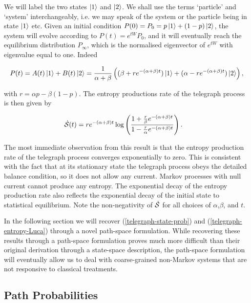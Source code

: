 We will label the two states $\ket{1} $ and $\ket{2}$. We shall use the terms `particle' and `system' interchangeably, i.e. we may speak of the system or the particle being in state $\ket{1}$ etc. Given an initial condition $P(0) = P_0 = p\ket{1}  + (1-p)\ket{2} $, the system will evolve according to $P(t) = e^{tW}P_0$, and it will eventually reach the equilibrium distribution $P_\infty$, which is the normalised eigenvector of $e^{tW}$ with eigenvalue equal to one. Indeed

\begin{equation}\label{telegraph-state-prob}
  P(t) = A(t)\ket{1}  + B(t)\ket{2}  = \frac{1}{\alpha + \beta} \left((\beta + re^{-(\alpha + \beta)t})\ket{1}  +
(\alpha - re^{-(\alpha + \beta)t})\ket{2}  \right) ,
\end{equation}

with $r = \alpha p - \beta(1-p)$. The entropy productions rate of the telegraph process is then given by  \cite{cocconi2020entropy}

\begin{align}\label{telegraph-entropy-Luca}
  \dot{\mathcal{S}}(t) &= re^{-(\alpha + \beta)t}\log \left(\frac{1+\frac{r}{\beta}e^{-(\alpha + \beta)t}}{1-\frac{r}{\alpha}e^{-(\alpha + \beta)t}}\right).
\end{align}


 The most immediate observation from this result is that the entropy production rate of the telegraph process converges exponentially to zero. This is consistent with the fact that at its stationary state the telegraph process obeys the detailed balance condition, so it does not allow any current. Markov processes with null current cannot produce any entropy. The exponential decay of the entropy production rate also reflects the exponential decay of the initial state to statistical equilibrium. Note the non-negativity of $\dot{\mathcal{S}}$ for all choices of $\alpha$,$\beta$, and $t$. 

 In the following section we will recover (\ref{telegraph-state-prob}) and (\ref{telegraph-entropy-Luca}) through a novel path-space formulation. While recovering these results through a path-space formulation proves much more difficult than their original derivation through a state-space description, the path-space formulation will eventually allow us to deal with coarse-grained non-Markov systems that are not responsive to classical treatments.

\subsection{Path Probabilities}\label{two_state_path_prob}

